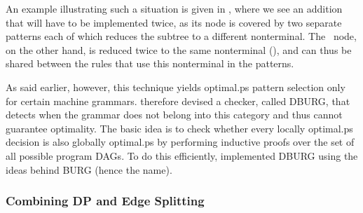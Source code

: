 %
%    

An example illustrating such a situation is given in ,
where we see an addition that will have to be implemented twice, as its
\gls{node} is covered by two separate \glspl{pattern} each of which reduces the
\gls{subtree} to a different \gls{nonterminal}.
%
The ~\gls{node}, on the
other hand, is reduced twice to the same \gls{nonterminal} (), and can
thus be shared between the \glspl{rule} that use this \gls{nonterminal} in the
\glspl{pattern}.

As said earlier, however, this technique yields \gls{optimal.ps} \gls{pattern
  selection} only for certain \glspl{machine grammar}.
%
\citeauthor{Ertl1999} therefore devised a checker, called
\gls{DBURG}, that detects when the \gls{grammar} does not belong into this
category and thus cannot guarantee optimality.
%
The basic idea is to check
whether every locally \gls{optimal.ps} decision is also globally
\gls{optimal.ps} by performing inductive proofs over the set of all
possible \glspl{program DAG}.
%
To do this efficiently, \citeauthor{Ertl1999}
implemented \gls{DBURG} using the ideas behind \gls{BURG} (hence the name).


\subsubsection{Combining DP and Edge Splitting}

\def\overlapCost{overlap-cost\xspace}
\def\cseCost{cse-cost\xspace}

